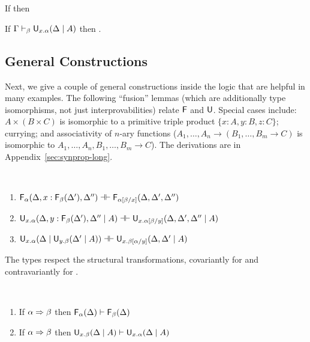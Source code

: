 \begin{corollary} \label{cor:contraction}
\item If
then
\end{corollary}

\begin{corollary} \label{cor:Uinv}
If $\Gamma \vdash_{\beta} \mathsf{U}_{x.\alpha}(\Delta \mid A)$ then 
{}.
\end{corollary}

\subsection{General Constructions}

Next, we give a couple of general constructions inside the logic that
are helpful in many examples.  The following ``fusion'' lemmas (which
are additionally type isomorphisms, not just interprovabilities) relate
$\mathsf{F}$ and $\mathsf{U}$.  Special cases include: $A \times (B \times C)$
is isomorphic to a primitive triple product $\{x:A,y:B,z:C\}$; currying;
and associativity of $n$-ary functions ($A_1,\ldots,A_n \to
(B_1,\ldots,B_m \to C)$ is isomorphic to $A_1,\ldots,A_n,B_1,\ldots,B_m
\to C$).  The derivations are in Appendix~\ref{sec:synprop-long}.

\begin{lemma}[Fusion] ~ \label{lem:fusion}
\begin{enumerate} 

\item $\mathsf{F}_{\alpha}(\Delta,x:\mathsf{F}_{\beta}(\Delta'),\Delta'') \dashv \vdash
  \mathsf{F}_{\alpha[\beta/x]}(\Delta,\Delta',\Delta'')$

\item $\mathsf{U}_{x.\alpha}(\Delta,y:\mathsf{F}_{\beta}(\Delta'),\Delta'' \mid A) \dashv \vdash
  \mathsf{U}_{x.\alpha[\beta/y]}(\Delta,\Delta',\Delta'' \mid A)$

\item 
$\mathsf{U}_{x.\alpha}(\Delta \mid \mathsf{U}_{y.\beta}(\Delta' \mid A)) \dashv \vdash
 \mathsf{U}_{x.\beta[\alpha/y]}(\Delta,\Delta' \mid A)$

\end{enumerate}
\end{lemma}

The types respect the structural transformations, covariantly for
\Fsymb\/ and contravariantly for \Usymb\/.

\begin{lemma} ~ \label{lem:typespr}
\begin{enumerate}
\item 
 If $\alpha \Rightarrow \beta$ then $\mathsf{F}_{\alpha}(\Delta) \vdash
 \mathsf{F}_{\beta}(\Delta)$

\item If $\alpha \Rightarrow \beta$ then $\mathsf{U}_{x.\beta}(\Delta \mid A) \vdash
  \mathsf{U}_{x.\alpha}(\Delta \mid A)$
\end{enumerate}
\end{lemma}

